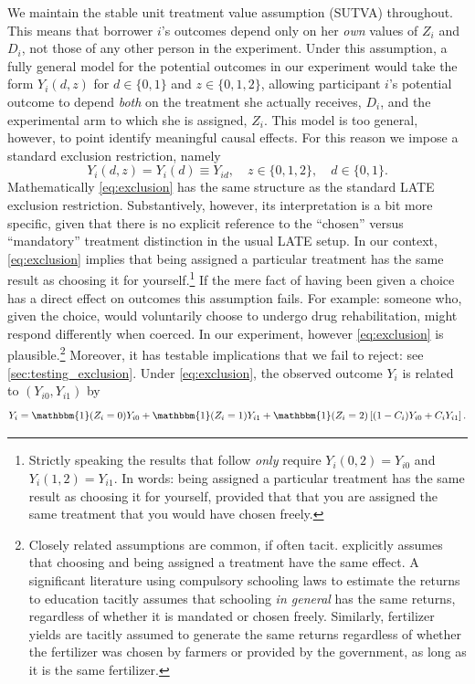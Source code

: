 \documentclass[12pt, a4paper, colorinlistoftodos]{article}
\begin{document}
We maintain the stable unit treatment value assumption (SUTVA) throughout. 
This means that borrower $i$'s outcomes depend only on her \emph{own} values of $Z_i$ and $D_i$, not those of any other person in the experiment. 
Under this assumption, a fully general model for the potential outcomes in our experiment would take the form $Y_i(d, z)$ for $d\in \{0,1\}$ and $z \in \{0, 1, 2\}$, allowing participant $i$'s potential outcome to depend \emph{both} on the treatment she actually receives, $D_i$, and the experimental arm to which she is assigned, $Z_i$. 
This model is too general, however, to point identify meaningful causal effects. 
For this reason we impose a standard exclusion restriction, namely
\begin{equation}
Y_i(d,z) = Y_i(d) \equiv Y_{id},\quad z \in \{0, 1, 2\}, \quad d\in \{0, 1\}.
\label{eq:exclusion}
\end{equation}
Mathematically \eqref{eq:exclusion} has the same structure as the standard LATE exclusion restriction. 
Substantively, however, its interpretation is a bit more specific, given that there is no explicit reference to the ``chosen'' versus ``mandatory'' treatment distinction in the usual LATE setup.
In our context, \eqref{eq:exclusion} implies that being assigned a particular treatment has the same result as choosing it for yourself.\footnote{Strictly speaking the results that follow \emph{only} require $Y_i(0,2)=Y_{i0}$ and $Y_i(1,2) = Y_{i1}$. In words: being assigned a particular treatment has the same result as choosing it for yourself, provided that that you are assigned the same treatment that you would have chosen freely.}
If the mere fact of having been given a choice has a direct effect on outcomes this assumption fails. 
For example: someone who, given the choice, would voluntarily choose to undergo drug rehabilitation, might respond differently when coerced.
In our experiment, however \eqref{eq:exclusion} is plausible.\footnote{Closely related assumptions are common, if often tacit. \cite{chamberlain2011bayesian} explicitly assumes that choosing and being assigned a treatment have the same effect. A significant literature using compulsory schooling laws to estimate the returns to education tacitly assumes that schooling \emph{in general} has the same returns, regardless of whether it is mandated or chosen freely. Similarly, fertilizer yields are tacitly assumed to generate the same returns regardless of whether the fertilizer was chosen by farmers or provided by the government, as long as it is the same fertilizer.} 
Moreover, it has testable implications that we fail to reject: see \autoref{sec:testing_exclusion}. 
Under \eqref{eq:exclusion}, the observed outcome $Y_i$ is related to $(Y_{i0}, Y_{i1})$ by 
\begin{equation}
    Y_i = \mathbbm{1}(Z_i =0) Y_{i0} + \mathbbm{1}(Z_i = 1)  Y_{i1}  + \mathbbm{1}(Z_i = 2) \left[(1 - C_i) Y_{i0} + C_i Y_{i1} \right].
\label{eq:potentialOutcomes}
\end{equation}
\end{document}
